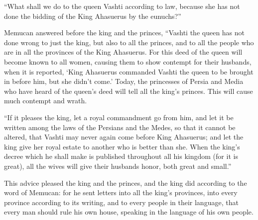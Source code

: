 {“What shall we do to the queen Vashti according to law, because she has not done the bidding of the King Ahasuerus by the eunuchs?”
\par }{\PP {}Memucan answered before the king and the princes, “Vashti the queen has not done wrong to just the king, but also to all the princes, and to all the people who are in all the provinces of the King Ahasuerus.
For this deed of the queen will become known to all women, causing them to show contempt for their husbands, when it is reported, ‘King Ahasuerus commanded Vashti the queen to be brought in before him, but she didn’t come.’
Today, the princesses of Persia and Media who have heard of the queen’s deed will tell all the king’s princes. This will cause much contempt and wrath.
\par }{\PP {}“If it pleases the king, let a royal commandment go from him, and let it be written among the laws of the Persians and the Medes, so that it cannot be altered, that Vashti may never again come before King Ahasuerus; and let the king give her royal estate to another who is better than she.
When the king’s decree which he shall make is published throughout all his kingdom (for it is great), all the wives will give their husbands honor, both great and small.”
\par }{\PP {}This advice pleased the king and the princes, and the king did according to the word of Memucan:
for he sent letters into all the king’s provinces, into every province according to its writing, and to every people in their language, that every man should rule his own house, speaking in the language of his own people.

}
